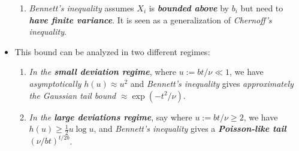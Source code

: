 \documentclass[11pt]{article}
\begin{document}
\begin{itemize}
\begin{remark}
\begin{enumerate}
\item \emph{Bennett's inequality} assumes $X_i$ is \emph{\textbf{bounded above}} by $b_i$ but need to \emph{\textbf{have finite variance}}. It is seen as a generalization of \emph{Chernoff's inequality}.
\end{enumerate}
\end{remark}

\item \begin{remark} This bound can be analyzed in two different regimes:
\begin{enumerate}
\item \emph{In the \textbf{small deviation regime}}, where $u := b t/ \nu \ll 1$, we have \emph{asymptotically} $h(u) \approx u^2$ and \emph{Bennett's inequality} gives \emph{approximately the Gaussian tail bound} $\approx \exp(-t^2/\nu)$. 

\item \emph{In the \textbf{large deviations regime}}, say where $u := b t/ \nu \ge 2$, we have $h(u) \ge \frac{1}{2}u \log u$, and \emph{Bennett's inequality} gives a \emph{\textbf{Poisson-like tail}} $(\nu/bt)^{t/2 b}$.
\end{enumerate}
\end{remark}
\end{itemize}
\end{document}
